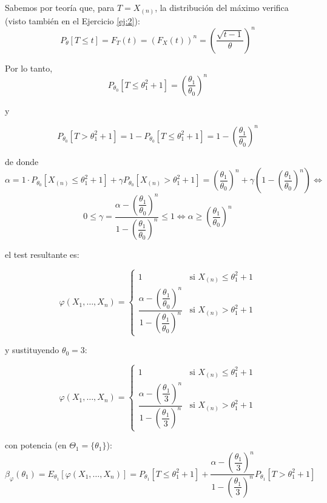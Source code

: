 \documentclass[12pt]{article}
\begin{document}
\begin{ejercicio}
        Sabemos por teoría que, para $T = X_{(n)}$, la distribución del máximo verifica (visto también en el Ejercicio \ref{ej:2}): 
        $$P_{\theta}[T \leq t] = F_T(t) = (F_X(t))^n = \left( \dfrac{\sqrt{t-1}}{\theta} \right)^{n}$$

        Por lo tanto, $$P_{\theta_0}[T \leq \theta_1^2 + 1] = \left( \dfrac{\theta_1}{\theta_0} \right)^{n}$$

        y

        $$P_{\theta_0}[T > \theta_1^2 + 1] = 1 - P_{\theta_0}[T \leq \theta_1^2 + 1] = 1 - \left( \dfrac{\theta_1}{\theta_0} \right)^{n}$$

        de donde
        $$\alpha = 1 \cdot P_{\theta_0}[X_{(n)} \leq \theta_1^2 + 1] + 
        \gamma P_{\theta_0}[X_{(n)} > \theta_1^2 + 1] = \left( \dfrac{\theta_1}{\theta_0} \right)^{n} + \gamma \left( 1 - \left( \dfrac{\theta_1}{\theta_0} \right)^{n} \right) \iff $$
        $$0 \leq \gamma = \dfrac{\alpha - \left( \dfrac{\theta_1}{\theta_0} \right)^{n}}{1 - \left( \dfrac{\theta_1}{\theta_0} \right)^{n}} \leq 1 \iff \alpha \geq \left( \dfrac{\theta_1}{\theta_0} \right)^{n}$$

        el test resultante es:

        $$\varphi(X_1, \ldots, X_n) = 
            \begin{cases}
                1 &\text{si } X_{(n)} \leq \theta_1^2 + 1 \\
                \dfrac{\alpha - \left( \dfrac{\theta_1}{\theta_0} \right)^{n}}{1 - \left( \dfrac{\theta_1}{\theta_0} \right)^{n}} &\text{si } X_{(n)} > \theta_1^2 + 1
            \end{cases}$$   
            
        y sustituyendo $\theta_0 = 3$:

        $$\varphi(X_1, \ldots, X_n) = 
            \begin{cases}
                1 &\text{si } X_{(n)} \leq \theta_1^2 + 1 \\
                \dfrac{\alpha - \left( \dfrac{\theta_1}{3} \right)^{n}}{1 - \left( \dfrac{\theta_1}{3} \right)^{n}} &\text{si } X_{(n)} > \theta_1^2 + 1
            \end{cases}$$
            
        con potencia (en $\Theta_1 = \{\theta_1\}$):
        $$\beta_{\varphi}(\theta_1) = E_{\theta_1}[\varphi(X_1, \ldots, X_n)] = P_{\theta_1}[T \leq \theta_1^2 + 1] + 
        \dfrac{\alpha - \left( \dfrac{\theta_1}{3} \right)^{n}}{1 - \left( \dfrac{\theta_1}{3} \right)^{n}} P_{\theta_1}[T > \theta_1^2 + 1]$$


\end{ejercicio}
\end{document}

